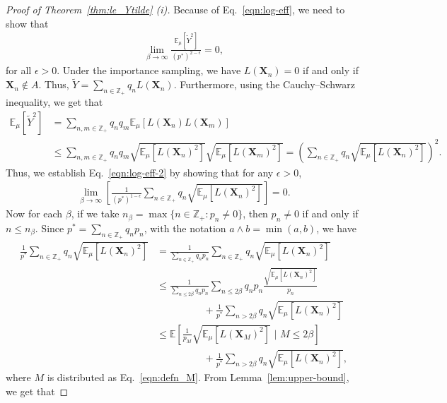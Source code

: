 \documentclass[pdflatex, sn-mathphys-ay]{sn-jnl}%
\newcommand{\intg}{\mathbb{Z}}
\renewcommand{\v}[1]{\boldsymbol{#1}}
\newcommand{\ee}{\mathbb{E}}
\newcommand{\mX}{\v{X}}
\newcommand{\lt}{\left}
\newcommand{\rt}{\right}
\newcommand{\wt}{\widetilde}
\theoremstyle{thmstyleone}%
\theoremstyle{thmstyletwo}%
\theoremstyle{thmstylethree}%
\begin{document}
\begin{proof}[Proof of Theorem~\ref{thm:le_Ytilde} (i)]
Because of  Eq.~\eqref{eqn:log-eff}, we need to show that 
\begin{align}
\lim_{\beta \to \infty} \frac{\ee_\mu[\wt Y^2]}{(p^*)^{2-\epsilon}} = 0, \label{eqn:log-eff-2}
\end{align}
for all $\epsilon > 0$. 
Under the importance sampling, we have $L(\mX_n) = 0$ if and only if $\mX_n \notin A$. Thus,
$\wt Y =  \sum_{n\in \intg_+} q_n L(\mX_n).$
Furthermore, using the Cauchy–Schwarz inequality, we get that
\begin{align*}
    \ee_\mu[\wt Y^2] 
    &= \sum_{n, m \in \intg_+} q_n q_m \ee_\mu[L(\mX_n) L(\mX_m)]\\
    &\leq \sum_{n, m \in \intg_+} q_n q_m \sqrt{\ee_\mu[L(\mX_n)^2]} \sqrt{\ee_\mu[L(\mX_m)^2]}
    = \lt(\sum_{n\in \intg_+} q_n \sqrt{\ee_\mu[L(\mX_n)^2]}\rt)^2.
\end{align*}
Thus, we establish Eq.~\eqref{eqn:log-eff-2} by showing that for any $\epsilon > 0$,
\begin{align}
    \lim_{\beta \to \infty} \lt[\frac{1}{(p^*)^{1 - \epsilon}}\sum_{n\in \intg_+} q_n \sqrt{\ee_\mu[L(\mX_n)^2]}\rt] = 0.
    \label{eqn:equiv-limit}
\end{align}
Now for each $\beta$, if we take $n_\beta = \max\{ n \in \intg_+: p_n \neq 0\}$, then $p_n \neq 0$ if and only if $n \leq n_\beta$. Since $p^* = \sum_{n\in \intg_+} q_n p_n$, with the notation $a \wedge b = \min(a, b)$, we have 
\begin{align}
\frac{1}{p^*} \sum_{n\in \intg_+} q_n \sqrt{\ee_\mu[L(\mX_n)^2]} &=
    \frac{1}{\sum_{n\in \intg_+} q_n p_n} \sum_{n\in \intg_+} q_n \sqrt{\ee_\mu[L(\mX_n)^2]}\nonumber\\ 
    &\leq \frac{1}{\sum_{n \leq  2\beta} q_n p_n} \sum_{n \leq  2\beta} q_n p_n \frac{\sqrt{\ee_\mu[L(\mX_n)^2]}}{p_n} \nonumber\\
    &\hspace{2cm} + \frac{1}{p^*}\sum_{n > 2\beta} q_n \sqrt{\ee_\mu[L(\mX_n)^2]}\nonumber\\
    &\leq \ee\lt[\frac{1}{p_M} \sqrt{\ee_\mu[L(\mX_M)^2]} \,\,\bigg|\,\, M \leq 2\beta\rt] 
    \nonumber\\ 
    &\hspace{2cm}
    + \frac{1}{p^*}\sum_{n > 2\beta} q_n \sqrt{\ee_\mu[L(\mX_n)^2]}, \label{eqn:split-expression}
\end{align}
where $M$ is distributed as Eq.~\eqref{eqn:defn_M}. From Lemma~\ref{lem:upper-bound}, we get that

\end{proof}
\end{document}
